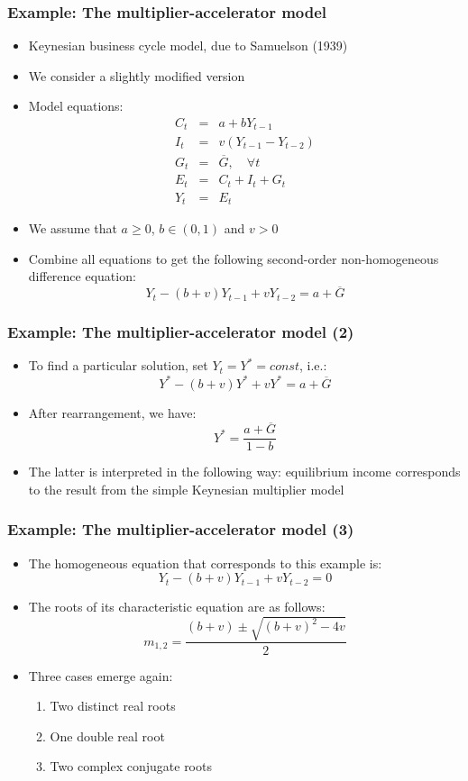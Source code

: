 \documentclass[10pt,usenames,dvipsnames]{beamer}
\theoremstyle{plain}
\theoremstyle{definition}
\begin{document}
\begin{frame}[fragile]
\frametitle{Example: The multiplier-accelerator model}
\begin{itemize}
	\item Keynesian business cycle model, due to Samuelson (1939)
	\item We consider a slightly modified version
	\item Model equations:
	\[
		\begin{array}{lcl}
			C_{t} & = & a + bY_{t-1}\\
			I_{t} & = & v(Y_{t-1} - Y_{t-2})\\
			G_{t} & = & \overline{G}, \quad \forall t\\
			E_{t} & = & C_{t} + I_{t} + G_{t}\\
			Y_{t} & = & E_{t}
		\end{array}
	\]
	\item We assume that  $a \geq 0$, $b \in (0,1)$ and $v>0$
	\item Combine all equations to get the following second-order non-homogeneous difference equation:
	\[
		Y_{t} - (b + v)Y_{t-1} + vY_{t-2} = a + \overline{G}
	\]
\end{itemize}
\end{frame}

\begin{frame}[fragile]
\frametitle{Example: The multiplier-accelerator model (2)}
\begin{itemize}
	\item To find a particular solution, set $Y_{t} = Y^{*} = const$, i.e.:
	\[
		Y^{*} - (b + v)Y^{*} + vY^{*} = a + \overline{G}
	\]
	\item After rearrangement, we have:
	\[
		Y^{*} = \frac{a + \overline{G}}{1-b}
	\]
	\item The latter is interpreted in the following way: equilibrium income corresponds to the result from the simple Keynesian multiplier model
\end{itemize}
\end{frame}

\begin{frame}[fragile]
\frametitle{Example: The multiplier-accelerator model (3)}
\begin{itemize}
	\item The homogeneous equation that corresponds to this example is:
	\[
		Y_{t} - (b + v)Y_{t-1} + vY_{t-2} = 0
	\]
	\item The roots of its characteristic equation are as follows:
	\[
		m_{1,2} = \frac{(b+v) \pm \sqrt{(b+v)^{2} - 4v}}{2}
	\]
	\item Three cases emerge again:
	\begin{enumerate}
		\item Two distinct real roots
		\item One double real root
		\item Two complex conjugate roots
	\end{enumerate}
\end{itemize}
\end{frame}
\end{document}
